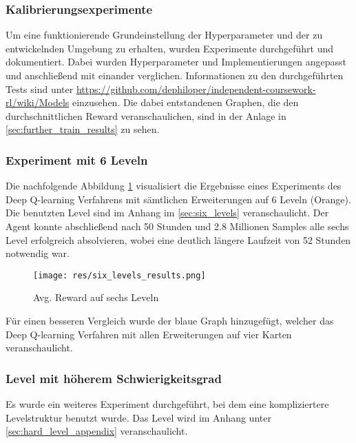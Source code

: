 \documentclass[11pt]{scrartcl}
\begin{document}
\subsubsection{Kalibrierungsexperimente}
\label{sec:calibration_experiments}
Um eine funktionierende Grundeinstellung der Hyperparameter und der zu entwickelnden
Umgebung zu erhalten, wurden Experimente durchgeführt und dokumentiert. Dabei wurden
Hyperparameter und Implementierungen angepasst und anschließend mit einander verglichen.
Informationen zu den durchgeführten Tests sind unter
\url{https://github.com/dephiloper/independent-coursework-rl/wiki/Models} einzusehen. Die
dabei entstandenen Graphen, die den durchschnittlichen Reward veranschaulichen, sind in
der Anlage in \autoref{sec:further_train_results} zu sehen.

\subsubsection{Experiment mit 6 Leveln}
Die nachfolgende Abbildung \ref{fig:six_levels_results} visualisiert die Ergebnisse
eines Experiments des Deep Q-learning Verfahrens mit sämtlichen Erweiterungen auf 6 Leveln
(Orange). Die benutzten Level sind im Anhang im \autoref{sec:six_levels} veranschaulicht.
Der Agent konnte abschließend nach 50 Stunden
und 2.8 Millionen Samples alle sechs Level erfolgreich absolvieren, wobei eine deutlich
längere Laufzeit von 52 Stunden notwendig war.

\begin{figure}[htp]
\centering
\texttt{[image: res/six\_levels\_results.png]}
\caption{Avg. Reward auf sechs Leveln}
\label{fig:six_levels_results}
\end{figure}

Für einen besseren Vergleich wurde der blaue Graph hinzugefügt, welcher das Deep Q-learning
Verfahren mit allen Erweiterungen auf vier Karten veranschaulicht.

\subsubsection{Level mit höherem Schwierigkeitsgrad}
\label{sec:hard_level}
Es wurde ein weiteres Experiment durchgeführt, bei dem eine kompliziertere Levelstruktur
benutzt wurde. Das Level wird im Anhang unter \ref{sec:hard_level_appendix} veranschaulicht.


\end{document}
